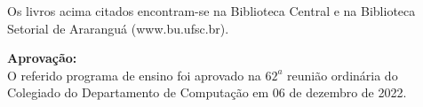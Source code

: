 Os livros acima citados encontram-se na Biblioteca Central e na Biblioteca Setorial de Ararangu\'a (www.bu.ufsc.br).

\vskip1cm

{\bf Aprovação: }\\

O referido programa de ensino foi aprovado na $62^a$ reuni\~ao ordin\'aria do Colegiado do Departamento de Computa\c c\~ao em 06 de dezembro de 2022.
